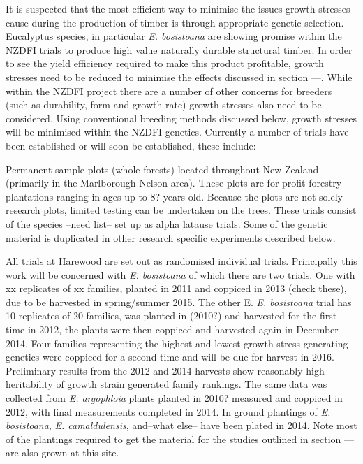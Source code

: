 \documentclass{article}
\begin{document}
It is suspected that the most efficient way to minimise the issues growth
stresses cause during the production of timber is through appropriate genetic
selection. Eucalyptus species, in particular \textit{E. bosistoana} are showing promise
within the NZDFI trials to produce high value naturally durable structural
timber. In order to see the yield efficiency required to make this product
profitable, growth stresses need to be reduced to minimise the effects discussed
in section ---. While within the NZDFI project there are a number of other
concerns for breeders (such as durability, form and growth rate) growth stresses
also need to be considered. Using conventional breeding methods discussed below,
growth stresses will be minimised within the NZDFI genetics. Currently a number
of trials have been established or will soon be established, these include:

Permanent sample plots (whole forests) located throughout New Zealand (primarily
in the Marlborough Nelson area). These plots are for profit forestry plantations
ranging in ages up to 8? years old. Because the plots are not solely research
plots, limited testing can  be undertaken on the trees. These trials consist of
the species --need list-- set up as alpha latause trials. Some of the genetic
material is duplicated in other research specific experiments described below.

All trials at Harewood are set out as randomised individual trials. Principally
this work will be concerned with \textit{E. bosistoana} of which there  are two
trials.
One with xx replicates of xx families, planted in 2011 and coppiced in 2013
(check these), due to be harvested in spring/summer 2015. The other E.
\textit{E. bosistoana} trial has 10 replicates of 20 families, was planted in (2010?) and
harvested for the first time in 2012, the plants were then coppiced and
harvested again in December 2014. Four families representing the highest and
lowest growth stress generating genetics were coppiced for a second time and
will be due for harvest in 2016. Preliminary results from the 2012 and 2014
harvests show reasonably high heritability of growth strain generated family
rankings. The same data was collected from \textit{E. argophloia} plants planted in 2010?
measured and coppiced in 2012, with final measurements completed in 2014.  In
ground plantings of \textit{E. bosistoana}, \textit{E. camaldulensis}, and--what else-- have been
plated in 2014. Note most of the plantings required to get the material for the
studies outlined in section --- are also grown at this site.
\end{document}
